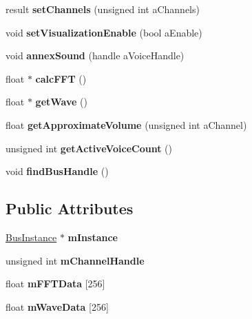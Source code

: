 \begin{DoxyCompactItemize}
result {\bfseries set\+Channels} (unsigned int a\+Channels)
\item 
\mbox{\label{class_so_loud_1_1_bus_a4367e7475af9b3bd5959dc103fd30e21}} 
void {\bfseries set\+Visualization\+Enable} (bool a\+Enable)
\item 
\mbox{\label{class_so_loud_1_1_bus_a27fa3c04d02499237129a9a2105e6efc}} 
void {\bfseries annex\+Sound} (handle a\+Voice\+Handle)
\item 
\mbox{\label{class_so_loud_1_1_bus_a8c8f966f622040c733c1eda00667424b}} 
float $\ast$ {\bfseries calc\+F\+FT} ()
\item 
\mbox{\label{class_so_loud_1_1_bus_a53ab12f075dbafe2cb7f4742ae58bd71}} 
float $\ast$ {\bfseries get\+Wave} ()
\item 
\mbox{\label{class_so_loud_1_1_bus_a61ac8bd9a04baf87bbea06d8f34d371b}} 
float {\bfseries get\+Approximate\+Volume} (unsigned int a\+Channel)
\item 
\mbox{\label{class_so_loud_1_1_bus_a54f5ed64f7d175d2356eaee83131421c}} 
unsigned int {\bfseries get\+Active\+Voice\+Count} ()
\item 
\mbox{\label{class_so_loud_1_1_bus_a171589a229eab854123bf6f88086a5d1}} 
void {\bfseries find\+Bus\+Handle} ()
\end{DoxyCompactItemize}
\subsection*{Public Attributes}
\begin{DoxyCompactItemize}
\item 
\mbox{\label{class_so_loud_1_1_bus_aa4b3c29a794cfe468d6871f69a1f8e92}} 
\mbox{\hyperlink{class_so_loud_1_1_bus_instance}{Bus\+Instance}} $\ast$ {\bfseries m\+Instance}
\item 
\mbox{\label{class_so_loud_1_1_bus_a0e5ce0894c817cdd158922989bde0387}} 
unsigned int {\bfseries m\+Channel\+Handle}
\item 
\mbox{\label{class_so_loud_1_1_bus_a38a6d2c789a33659f07dd911b93327e3}} 
float {\bfseries m\+F\+F\+T\+Data} \mbox{[}256\mbox{]}
\item 
\mbox{\label{class_so_loud_1_1_bus_a722292f1f9cb03c851497a5e9cd9f551}} 
float {\bfseries m\+Wave\+Data} \mbox{[}256\mbox{]}
\end{DoxyCompactItemize}
